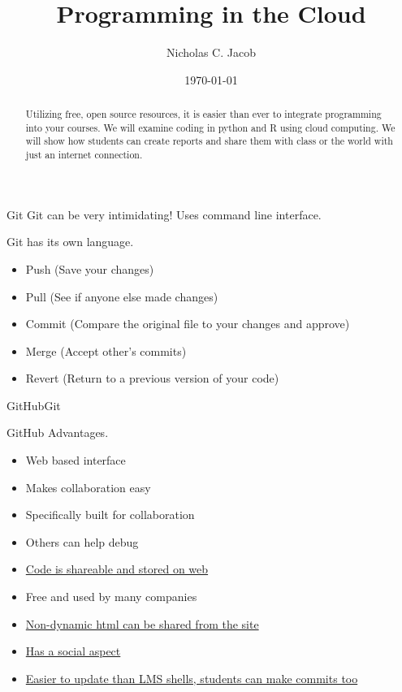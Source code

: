 \documentclass[xcolor=pdftex,dvipsnames,table]{beamer}
\title{Programming in the Cloud}
\author{Nicholas C. Jacob}
\date{\today}
\begin{document}
\begin{frame}
\maketitle
\begin{abstract}
Utilizing free, open source resources, it is easier than ever to integrate programming into your courses.  We will examine coding in python and R using cloud computing.  We will show how students can create reports and share them with class or the world with just an internet connection.
\end{abstract}
\end{frame}


\begin{frame}{Git}
Git can be very intimidating! \pause  
Uses command line interface.  \pause

Git has its own language.  
\begin{itemize}
\item Push (Save your changes)\pause 
\item Pull (See if anyone else made changes)\pause
\item Commit (Compare the original file to your changes and approve)\pause
\item  Merge (Accept other\rq{}s commits) \pause
\item Revert (Return to a previous version of your code)\pause
\end{itemize}


\end{frame}

\begin{frame}{GitHub}{Git}

GitHub Advantages.
\begin{itemize}
\item Web based interface \pause
\item Makes collaboration easy 
\item Specifically built for collaboration\pause
\item Others can help debug\pause
\item \href{https://github.com/nurfnick/Data_Sets_For_Stats/blob/master/rExamples/hockey_paper.Rmd} {Code is shareable and stored on web}\pause 
\item Free and used by many companies\pause
\item \href{https://nurfnick.github.io/Data_Sets_For_Stats/rExamples/hockey_paper.html}{Non-dynamic html can be shared from the site} \pause
\item \href{https://github.com/nurfnick}{Has a social aspect} \pause
\item \href{https://github.com/nurfnick/Data_Sets_For_Stats}{Easier to update than LMS shells, students can make commits too}
\end{itemize}
\end{frame}
\end{document}
